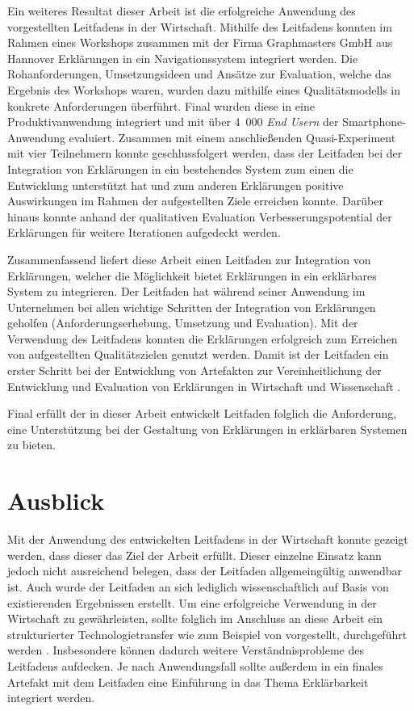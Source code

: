 Ein weiteres Resultat dieser Arbeit ist die erfolgreiche Anwendung des vorgestellten Leitfadens in der Wirtschaft. Mithilfe des Leitfadens konnten im Rahmen eines Workshops zusammen mit der Firma Graphmasters GmbH aus Hannover Erklärungen in ein Navigationssystem integriert werden. Die Rohanforderungen, Umsetzungsideen und Ansätze zur Evaluation, welche das Ergebnis des Workshops waren, wurden dazu mithilfe eines Qualitätsmodells in konkrete Anforderungen überführt. Final wurden diese in eine Produktivanwendung integriert und mit über 4~000 \textit{End Usern} der Smartphone-Anwendung evaluiert. Zusammen mit einem anschließenden Quasi-Experiment mit vier Teilnehmern konnte geschlussfolgert werden, dass der Leitfaden bei der Integration von Erklärungen in ein bestehendes System zum einen die Entwicklung unterstützt hat und zum anderen Erklärungen positive Auswirkungen im Rahmen der aufgestellten Ziele erreichen konnte. Darüber hinaus konnte anhand der qualitativen Evaluation Verbesserungspotential der Erklärungen für weitere Iterationen aufgedeckt werden.

\newpage

Zusammenfassend liefert diese Arbeit einen Leitfaden zur Integration von Erklärungen, welcher die Möglichkeit bietet Erklärungen in ein erklärbares System zu integrieren. Der Leitfaden hat während seiner Anwendung im Unternehmen bei allen wichtige Schritten der Integration von Erklärungen geholfen (Anforderungserhebung, Umsetzung und Evaluation). Mit der Verwendung des Leitfadens konnten die Erklärungen erfolgreich zum Erreichen von aufgestellten Qualitätszielen genutzt werden. Damit ist der Leitfaden ein erster Schritt bei der Entwicklung von Artefakten zur Vereinheitlichung der Entwicklung und Evaluation von Erklärungen in Wirtschaft und Wissenschaft \cite{kohl_explainability_2019,lim_2009_assessing,sokol_explainability_2020}.

Final erfüllt der in dieser Arbeit entwickelt Leitfaden folglich die Anforderung, eine Unterstützung bei der Gestaltung von Erklärungen in erklärbaren Systemen zu bieten.

\section{Ausblick}

Mit der Anwendung des entwickelten Leitfadens in der Wirtschaft konnte gezeigt werden, dass dieser das Ziel der Arbeit erfüllt. Dieser einzelne Einsatz kann jedoch nicht ausreichend belegen, dass der Leitfaden allgemeingültig anwendbar ist. Auch wurde der Leitfaden an sich lediglich wissenschaftlich auf Basis von existierenden Ergebnissen erstellt. Um eine erfolgreiche Verwendung in der Wirtschaft zu gewährleisten, sollte folglich im Anschluss an diese Arbeit ein strukturierter Technologietransfer wie zum Beispiel von \citeauthor{4012630} vorgestellt, durchgeführt werden \cite{4012630}. Insbesondere können dadurch weitere Verständnisprobleme des Leitfadens aufdecken. Je nach Anwendungsfall sollte außerdem in ein finales Artefakt mit dem Leitfaden eine Einführung in das Thema Erklärbarkeit integriert werden.

